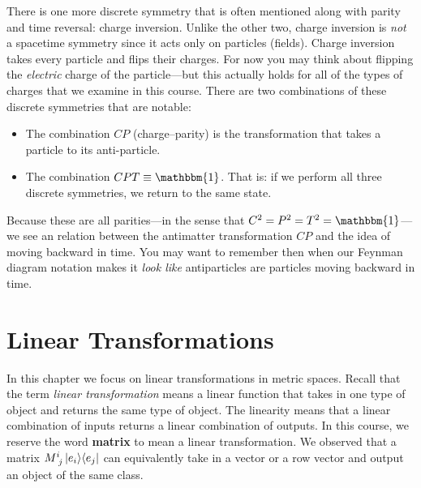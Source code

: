 \documentclass[12pt, oneside]{report}    %
\begin{document}
\begin{subappendices}
There is one more discrete symmetry that is often mentioned along with parity and time reversal: charge inversion. Unlike the other two, charge inversion is \emph{not} a spacetime symmetry since it acts only on particles (fields). Charge inversion takes every particle and flips their charges. For now you may think about flipping the \emph{electric} charge of the particle---but this actually holds for all of the types of charges that we examine in this course. There are two combinations of these discrete symmetries that are notable:
\begin{itemize}
    \item The combination $CP$ (charge--parity) is the transformation that takes a particle to its anti-particle.
    \item The combination $CPT \equiv \mathbbm{1}$. That is: if we perform all three discrete symmetries, we return to the same state.%
\end{itemize}
Because these are all parities---in the sense that $C^2 = P^2 = T^2 = \mathbbm{1}$---we see an relation between the antimatter transformation $CP$ and the idea of moving backward in time. You may want to remember then when our Feynman diagram notation makes it \emph{look like} antiparticles are particles moving backward in time.

\end{subappendices}








\chapter{Linear Transformations}

In this chapter we focus on linear transformations in metric spaces. Recall that the term \emph{linear transformation} means a linear function that takes in one type of object and returns the same type of object. The linearity means that a linear combination of inputs returns a linear combination of outputs. In this course, we reserve the word \textbf{matrix} to mean a linear transformation. We observed that a matrix $M\aij{i}{j}\ket{e_i}\!\bra{e_j}$ can equivalently take in a vector or a row vector and output an object of the same class. 
\end{document}
